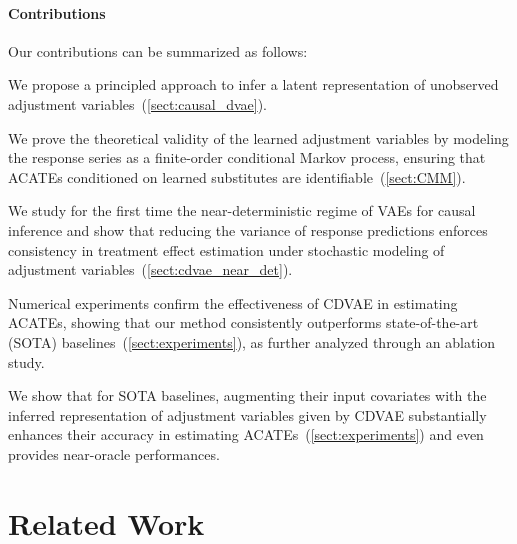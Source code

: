 \documentclass[10pt]{article} %
\begin{document}
\paragraph{Contributions} Our contributions can be summarized as follows:
\begin{inparaenum}[(1)]
    \item We propose a principled approach to infer a latent representation of unobserved adjustment variables~(\cref{sect:causal_dvae}).%
    \item We prove the theoretical validity of the learned adjustment variables by modeling the response series as a finite-order conditional Markov process, ensuring that ACATEs conditioned on learned substitutes are identifiable~(\cref{sect:CMM}).
    \item We study for the first time the near-deterministic regime of VAEs for causal inference and show that reducing the variance of response predictions enforces consistency in treatment effect estimation under stochastic modeling of adjustment variables~(\cref{sect:cdvae_near_det}).
    \item Numerical experiments confirm the effectiveness of CDVAE in estimating ACATEs, showing that our method consistently outperforms state-of-the-art (SOTA) baselines~(\cref{sect:experiments}), as further analyzed through an ablation study.
    \item We show that for SOTA baselines, augmenting their input covariates with the inferred representation of adjustment variables given by CDVAE substantially enhances their accuracy in estimating ACATEs~(\cref{sect:experiments}) and even provides near-oracle performances.
\end{inparaenum}

\section{Related Work}
\end{document}
